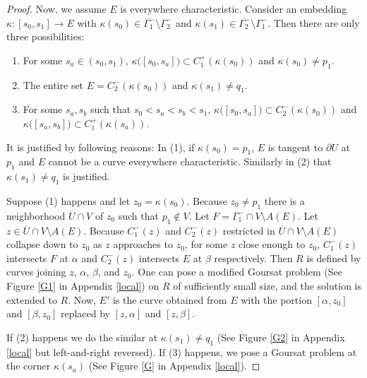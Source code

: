 \documentclass[11pt]{amsart}
\theoremstyle{plain}
\theoremstyle{remark}
\numberwithin{equation}{section}
\numberwithin{Thm}{section}
\def\U{\overline{U}}
\def\N{{\mathbf N}}
\begin{document}
\begin{proof}
Now, we assume $E$ is everywhere characteristic. Consider an embedding $\kappa:[s_0,s_1] \rightarrow E$ with $\kappa(s_0) \in \overline{\Gamma^-_1} \setminus \Gamma_2^-$ and $\kappa(s_1) \in \overline{\Gamma^-_2} \setminus \Gamma_1^-$. Then there are only three possibilities:
\begin{enumerate}
 \item For some $s_a \in (s_0,s_1)$, $\kappa\big([s_0,s_a]\big) \subset C^+_1(\kappa(s_0))$ and $\kappa(s_0)\ne p_1$.
 \item The entire set $E = C^-_2(\kappa(s_0))$ and $\kappa(s_1)\ne q_1$.
 \item For some $s_a, s_b$ such that $s_0 < s_a < s_b <s_1$, $\kappa\big([s_0,s_a]\big) \subset C^-_2(\kappa(s_0))$  and $\kappa\big([s_a,s_b]\big) \subset C^+_1(\kappa(s_a))$.
\end{enumerate}
It is justified by following reasons: In (1), if $\kappa(s_0)=p_1$, $E$ is tangent to $\partial U$ at $p_1$ and $E$ cannot be a curve everywhere characteristic. Similarly in (2) that $\kappa(s_1)\ne q_1$ is justified.

Suppose (1) happens and let $z_0=\kappa(s_0)$. Because $z_0\ne p_1$ there is a neighborhood $\U \cap V$ of $z_0$ such that $p_1\notin V$. Let $F=\Gamma^-_1 \cap V \setminus A(E)$. Let $z \in \U\cap V \setminus A(E)$. Because $C^-_1(z)$ and $C^-_2(z)$ restricted in $\U\cap V \setminus A(E)$ collapse down to $z_0$ as $z$ approaches to $z_0$, for some $z$ close enough to $z_0$, $C^-_1(z)$ intersects $F$ at $\alpha$ and $C^-_2(z)$ intersects $E$ at $\beta$ respectively. Then $R$ is defined by curves joining $z$, $\alpha$, $\beta$, and $z_0$. One can pose a modified Goursat problem (See Figure \ref{G1} in Appendix \ref{local}) on $R$ of sufficiently small size, and the solution is extended to $R$. Now, $E'$ is the curve obtained from $E$ with the portion $[\alpha,z_0]$ and $[\beta,z_0]$ replaced by $[z,\alpha]$ and $[z,\beta]$.

If (2) happens we do the similar at $\kappa(s_1)\ne q_1$ (See Figure \ref{G2} in Appendix \ref{local} but left-and-right reversed). If (3) happens, we pose a Goursat problem at the corner $\kappa(s_a)$ (See Figure \ref{G} in Appendix \ref{local}).

% 
% 


\end{proof}
\end{document}
